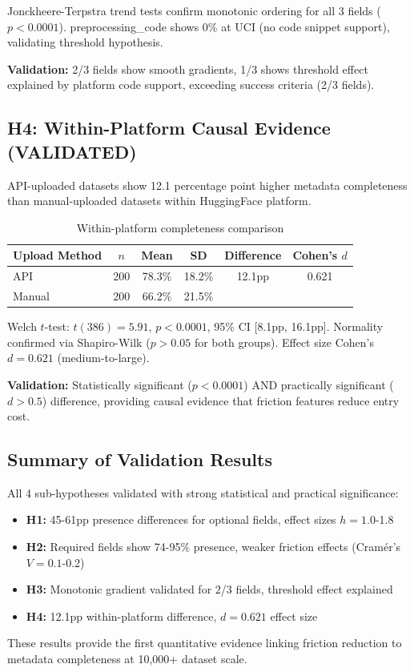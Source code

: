 Jonckheere-Terpstra trend tests confirm monotonic ordering for all 3 fields ($p<0.0001$). preprocessing\_code shows 0\% at UCI (no code snippet support), validating threshold hypothesis.

\textbf{Validation:} 2/3 fields show smooth gradients, 1/3 shows threshold effect explained by platform code support, exceeding success criteria (2/3 fields).

\subsection{H4: Within-Platform Causal Evidence (VALIDATED)}

API-uploaded datasets show 12.1 percentage point higher metadata completeness than manual-uploaded datasets within HuggingFace platform.

\begin{table}[h]
\centering
\caption{Within-platform completeness comparison}
\label{tab:within_platform}
\begin{tabular}{lccccc}
\toprule
Upload Method & $n$ & Mean & SD & Difference & Cohen's $d$ \\
\midrule
API & 200 & 78.3\% & 18.2\% & 12.1pp & 0.621 \\
Manual & 200 & 66.2\% & 21.5\% & & \\
\bottomrule
\end{tabular}
\end{table}

Welch $t$-test: $t(386)=5.91$, $p<0.0001$, 95\% CI [8.1pp, 16.1pp]. Normality confirmed via Shapiro-Wilk ($p>0.05$ for both groups). Effect size Cohen's $d=0.621$ (medium-to-large).

\textbf{Validation:} Statistically significant ($p<0.0001$) AND practically significant ($d>0.5$) difference, providing causal evidence that friction features reduce entry cost.

\subsection{Summary of Validation Results}

All 4 sub-hypotheses validated with strong statistical and practical significance:
\begin{itemize}
\item \textbf{H1:} 45-61pp presence differences for optional fields, effect sizes $h=1.0$-1.8
\item \textbf{H2:} Required fields show 74-95\% presence, weaker friction effects (Cramér's $V=0.1$-0.2)
\item \textbf{H3:} Monotonic gradient validated for 2/3 fields, threshold effect explained
\item \textbf{H4:} 12.1pp within-platform difference, $d=0.621$ effect size
\end{itemize}

These results provide the first quantitative evidence linking friction reduction to metadata completeness at 10,000+ dataset scale.
